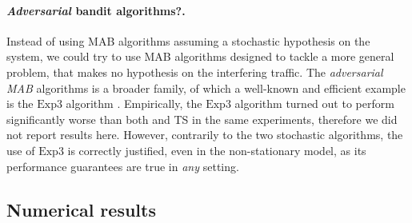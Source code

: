 \paragraph{\emph{Adversarial} bandit algorithms?.}

Instead of using MAB algorithms assuming a stochastic hypothesis on the system, we could try to use MAB algorithms designed to tackle a more general problem, that makes no hypothesis on the interfering traffic.
The \emph{adversarial MAB} algorithms is a broader family, of which a well-known and efficient example is the $\mathrm{Exp}3$ algorithm \cite{Auer02,Bubeck12}.
Empirically, the $\mathrm{Exp}3$ algorithm turned out to perform significantly worse than both \UCB{} and TS in the same experiments,
therefore we did not report results here.
However, contrarily to the two stochastic algorithms, the use of $\mathrm{Exp}3$ is correctly justified, even in the non-stationary model, as its performance guarantees are true in \emph{any} setting.



\subsection{Numerical results}\label{sub:41:numericalResults}

